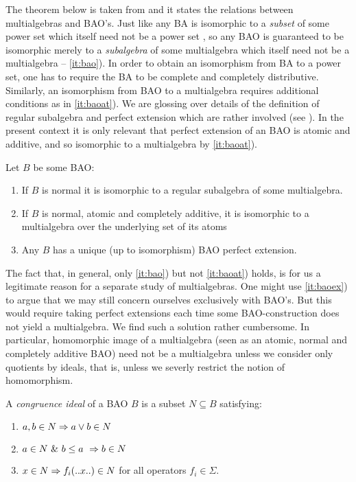 \documentclass[10pt]{article}
\begin{document}
\noindent
The theorem below is taken from \cite{JT1} and it states the relations
between multialgebras and BAO's.  Just like any BA is isomorphic to a
{\em subset} of some power set which itself need not be a power set
\cite{Stone1,Stone2}, so any BAO is guaranteed to be isomorphic merely
to a {\em subalgebra} of some multialgebra which itself need not be a
multialgebra -- \ref{it:bao}).  In order to obtain an isomorphism from
BA to a power set, one has to require the BA to be complete and
completely distributive. Similarly, an isomorphism from BAO to a
multialgebra requires additional conditions as in \ref{it:baoat}).  We
are glossing over details of the definition of regular subalgebra and
perfect extension which are rather involved (see \cite{JT1}). In the
present context it is only relevant that perfect extension of an BAO
is atomic and additive, and so isomorphic to a multialgebra by
\ref{it:baoat}).

\begin{Theorem}[\cite{JT1}]
\label{th:bao}
Let $B$ be some BAO:
\begin{enumerate}\MyLPar
\item
\label{it:bao} 
If $B$ is normal it is isomorphic to a regular subalgebra of some
multialgebra. 
\item
\label{it:baoat} 
If $B$ is normal, atomic and completely additive, it is isomorphic to
a multialgebra over the underlying set of its atoms
\item\label{it:baoex} Any $B$ has a unique (up to isomorphism) 
BAO perfect extension. 
\end{enumerate}
\end{Theorem}

\noindent
The fact that, in general, only \ref{it:bao}) but not \ref{it:baoat}) holds,
is for us a legitimate reason for a separate study of
multialgebras. One might use \ref{it:baoex}) to argue that we may
still concern ourselves exclusively with BAO's. But this would require
taking perfect extensions each time some BAO-construction does not
yield a multialgebra. We find such a solution rather cumbersome. In
particular, homomorphic image of a multialgebra (seen as an atomic,
normal and completely additive BAO) need not be a multialgebra unless
we consider only quotients by ideals, that is, unless we severly
restrict the notion of homomorphism.

\begin{Definition} A {\em congruence ideal} of a BAO $B$ is a subset 
$N\subseteq B$ satisfying: 
\begin{enumerate}\MyLPar
\item $a,b\in N\Rightarrow a\lor b\in N$
\item $a\in N\ \&\ b\leq a\ \Rightarrow b\in N$
\item $x\in N\Rightarrow f_i(..x..)\in N$ for all operators $f_i\in\Sigma$.
\end{enumerate}
\end{Definition}
\end{document}
